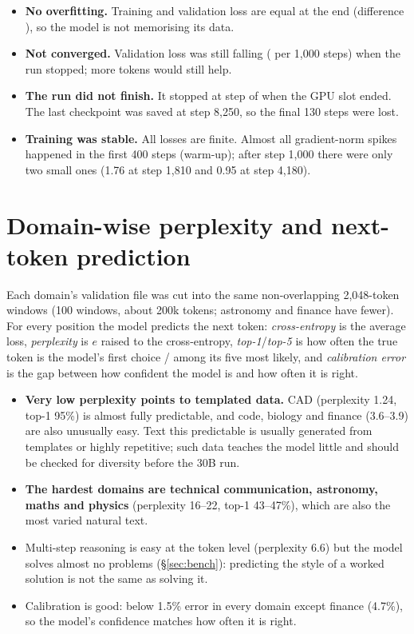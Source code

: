 \documentclass[11pt,a4paper]{article}
\begin{document}
\begin{itemize}
\item \textbf{No overfitting.} Training and validation loss are equal at the end (difference \Gap), so the model is not memorising its data.
\item \textbf{Not converged.} Validation loss was still falling (\ValSlope{} per 1,000 steps) when the run stopped; more tokens would still help.
\item \textbf{The run did not finish.} It stopped at step \LastStep{} of \MaxSteps{} when the GPU slot ended. The last checkpoint was saved at
  step 8,250, so the final 130 steps were lost.
\item \textbf{Training was stable.} All losses are finite. Almost all gradient-norm spikes happened in the first 400 steps (warm-up); after step 1,000
  there were only two small ones (1.76 at step 1,810 and 0.95 at step 4,180).
\end{itemize}

\section{Domain-wise perplexity and next-token prediction}
Each domain's validation file was cut into the same non-overlapping 2,048-token windows (100 windows, about 200k tokens; astronomy and finance
have fewer). For every position the model predicts the next token: \emph{cross-entropy} is the average loss, \emph{perplexity} is $e$ raised to the cross-entropy, \emph{top-1}/\emph{top-5} is how often the true token is the model's first choice / among its five most likely,
and \emph{calibration error} is the gap between how confident the model is and how often it is right.

\begin{table}[H]\centering\small

\caption{Next-token prediction for all 17 training domains, sorted by perplexity.}
\end{table}

\begin{itemize}
\item \textbf{Very low perplexity points to templated data.} CAD (perplexity 1.24, top-1 95\%) is almost fully predictable, and code, biology and
  finance (3.6--3.9) are also unusually easy. Text this predictable is usually generated from templates or highly repetitive; such data teaches
  the model little and should be checked for diversity before the 30B run.
\item \textbf{The hardest domains are technical communication, astronomy, maths and physics} (perplexity 16--22, top-1 43--47\%), which are also the
  most varied natural text.
\item Multi-step reasoning is easy at the token level (perplexity 6.6) but the model solves almost no problems (\S\ref{sec:bench}): predicting
  the style of a worked solution is not the same as solving it.
\item Calibration is good: below 1.5\% error in every domain except finance (4.7\%), so the model's confidence matches how often it is right.
\end{itemize}
\end{document}
